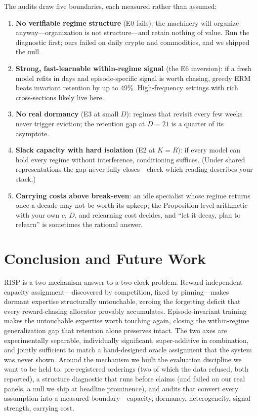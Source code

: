 \documentclass[10pt]{article}
\newcommand{\nm}{\textsc{RISP}}
\begin{document}
The audits draw five boundaries, each measured rather than assumed:
\begin{enumerate}[leftmargin=1.8em]
    \item \textbf{No verifiable regime structure} (E0 fails): the
    machinery will organize anyway---organization is not structure---and
    retain nothing of value. Run the diagnostic first; ours failed on
    daily crypto and commodities, and we shipped the null.
    \item \textbf{Strong, fast-learnable within-regime signal} (the E6
    inversion): if a fresh model refits in days and episode-specific
    signal is worth chasing, greedy ERM beats invariant retention by up
    to $49\%$. High-frequency settings with rich cross-sections likely
    live here.
    \item \textbf{No real dormancy} (E3 at small $D$): regimes that
    revisit every few weeks never trigger eviction; the retention gap at
    $D = 21$ is a quarter of its asymptote.
    \item \textbf{Slack capacity with hard isolation} (E2 at $K = R$):
    if every model can hold every regime without interference,
    conditioning suffices. (Under shared representations the gap never
    fully closes---check which reading describes your stack.)
    \item \textbf{Carrying costs above break-even}: an idle specialist
    whose regime returns once a decade may not be worth its upkeep; the
    Proposition-level arithmetic with your own $c$, $D$, and relearning
    cost decides, and ``let it decay, plan to relearn'' is sometimes the
    rational answer.
\end{enumerate}

\section{Conclusion and Future Work}

\nm{} is a two-mechanism answer to a two-clock problem. Reward-independent
capacity assignment---discovered by competition, fixed by pinning---makes
dormant expertise structurally untouchable, zeroing the forgetting deficit
that every reward-chasing allocator provably accumulates. Episode-invariant
training makes the untouchable expertise worth touching again, closing the
within-regime generalization gap that retention alone preserves intact.
The two axes are experimentally separable, individually significant,
super-additive in combination, and jointly sufficient to match a
hand-designed oracle assignment that the system was never shown. Around
the mechanism we built the evaluation discipline we want to be held to:
pre-registered orderings (two of which the data refused, both reported),
a structure diagnostic that runs before claims (and failed on our real
panels, a null we ship at headline prominence), and audits that convert
every assumption into a measured boundary---capacity, dormancy,
heterogeneity, signal strength, carrying cost.
\end{document}
